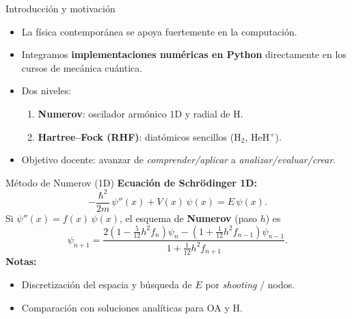 \documentclass[final]{beamer}
\begin{document}
\begin{frame}[t]
  
\begin{columns}[t,totalwidth=\textwidth]

\begin{column}{0.32\textwidth}

\begin{block}{Introducción y motivación}
\begin{itemize}
  \item La física contemporánea se apoya fuertemente en la computación.
  \item Integramos \textbf{implementaciones numéricas en Python} directamente en los cursos de mecánica cuántica.
  \item Dos niveles:
  \begin{enumerate}
    \item \textbf{Numerov}: oscilador armónico 1D y radial de H.
    \item \textbf{Hartree--Fock (RHF)}: diatómicos sencillos (H$_2$, HeH$^+$).
  \end{enumerate}
  \item Objetivo docente: avanzar de \emph{comprender/aplicar} a \emph{analizar/evaluar/crear}.
\end{itemize}
\end{block}

\begin{block}{Método de Numerov (1D)}
\textbf{Ecuación de Schrödinger 1D:}
\[
  -\frac{\hbar^2}{2m}\,\psi''(x) + V(x)\,\psi(x) = E\,\psi(x).
\]
Si $\psi''(x)=f(x)\,\psi(x)$, el esquema de \textbf{Numerov} (paso $h$) es
\[
  \psi_{n+1} =
  \frac{2\!\left(1-\tfrac{5}{12}h^2 f_n\right)\psi_n -
        \left(1+\tfrac{1}{12}h^2 f_{n-1}\right)\psi_{n-1}}
       {1+\tfrac{1}{12}h^2 f_{n+1}}.
\]
\textbf{Notas:}
\begin{itemize}
  \item Discretización del espacia y búsqueda de $E$ por \emph{shooting} / nodos.
  \item Comparación con soluciones analíticas para OA y H.
\end{itemize}


\end{block}
\end{column}
\end{columns}
\end{frame}
\end{document}
